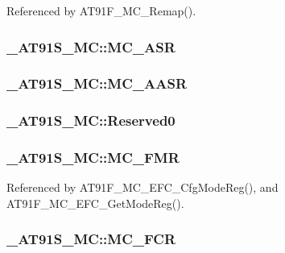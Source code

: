 Referenced by AT91F\_\-MC\_\-Remap().\hypertarget{struct__AT91S__MC_b47579897e838e5bbfb891e81da1652c}{
\subsubsection{ {\bf \_\-AT91S\_\-MC::MC\_\-ASR}}}
\label{struct__AT91S__MC_b47579897e838e5bbfb891e81da1652c}


\hypertarget{struct__AT91S__MC_f933b6454cfd253ef5432fdd3101d70f}{
\subsubsection{ {\bf \_\-AT91S\_\-MC::MC\_\-AASR}}}
\label{struct__AT91S__MC_f933b6454cfd253ef5432fdd3101d70f}


\hypertarget{struct__AT91S__MC_582ab62c12a101ecabef840aea6af54b}{
\subsubsection{ {\bf \_\-AT91S\_\-MC::Reserved0}}}
\label{struct__AT91S__MC_582ab62c12a101ecabef840aea6af54b}


\hypertarget{struct__AT91S__MC_9552be45c7dbc7f54aa406c6b77ee7e5}{
\subsubsection{ {\bf \_\-AT91S\_\-MC::MC\_\-FMR}}}
\label{struct__AT91S__MC_9552be45c7dbc7f54aa406c6b77ee7e5}




Referenced by AT91F\_\-MC\_\-EFC\_\-CfgModeReg(), and AT91F\_\-MC\_\-EFC\_\-GetModeReg().\hypertarget{struct__AT91S__MC_e7a860b146a2962b83c31ed2750da583}{
\subsubsection{ {\bf \_\-AT91S\_\-MC::MC\_\-FCR}}}
\label{struct__AT91S__MC_e7a860b146a2962b83c31ed2750da583}




